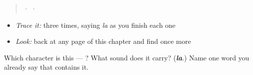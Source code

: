 \begin{quote}
  ·    ·  
\end{quote}

\begin{itemize}
\raggedright
  \item \emph{Trace it:}  three times, saying \emph{la} as you finish each one
  \item \emph{Look:} back at any page of this chapter and find  once more
\end{itemize}

\begin{tcolorbox}[breakable,colback=teal!4,colframe=teal!35!black,title={Before you move on}]
Which character is this — ? What sound does it carry? (\emph{\textbf{la}}.) Name one word you already say that contains it.
\end{tcolorbox}
